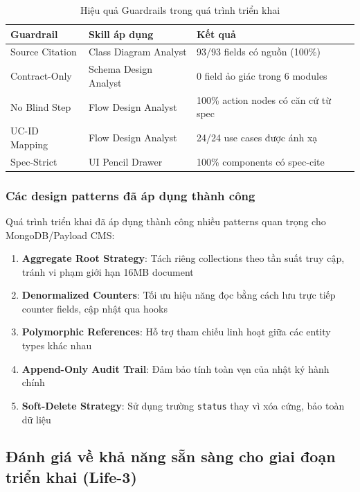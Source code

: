 \documentclass[13pt,a4paper,oneside]{extreport}
\numberwithin{equation}{chapter}
\numberwithin{figure}{chapter}
\numberwithin{table}{chapter}
\begin{document}
\begin{table}[H]
\centering
\caption{Hiệu quả Guardrails trong quá trình triển khai}
\begin{tabular}{|p{4cm}|p{3.5cm}|p{5.5cm}|}
\hline
\textbf{Guardrail} & \textbf{Skill áp dụng} & \textbf{Kết quả} \\
\hline
Source Citation & Class Diagram Analyst & 93/93 fields có nguồn (100\%) \\
\hline
Contract-Only & Schema Design Analyst & 0 field ảo giác trong 6 modules \\
\hline
No Blind Step & Flow Design Analyst & 100\% action nodes có căn cứ từ spec \\
\hline
UC-ID Mapping & Flow Design Analyst & 24/24 use cases được ánh xạ \\
\hline
Spec-Strict & UI Pencil Drawer & 100\% components có spec-cite \\
\hline
\end{tabular}
\end{table}

\subsubsection{Các design patterns đã áp dụng thành công}

Quá trình triển khai đã áp dụng thành công nhiều patterns quan trọng cho MongoDB/Payload CMS:

\begin{enumerate}
    \item \textbf{Aggregate Root Strategy}: Tách riêng collections theo tần suất truy cập, tránh vi phạm giới hạn 16MB document
    \item \textbf{Denormalized Counters}: Tối ưu hiệu năng đọc bằng cách lưu trực tiếp counter fields, cập nhật qua hooks
    \item \textbf{Polymorphic References}: Hỗ trợ tham chiếu linh hoạt giữa các entity types khác nhau
    \item \textbf{Append-Only Audit Trail}: Đảm bảo tính toàn vẹn của nhật ký hành chính
    \item \textbf{Soft-Delete Strategy}: Sử dụng trường \texttt{status} thay vì xóa cứng, bảo toàn dữ liệu
\end{enumerate}

\subsection{Đánh giá về khả năng sẵn sàng cho giai đoạn triển khai (Life-3)}
\end{document}
